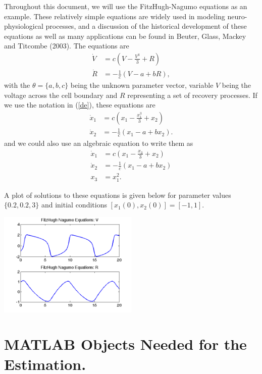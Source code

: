 \documentclass{article}
\begin{document}
Throughout this document, we will use the FitzHugh-Nagumo equations as an example. These relatively
simple equations are widely used in modeling neuro-physiological processes, and a discussion of the
historical development of these equations as well as many applications can be found in Beuter,
Glass, Mackey and Titcombe (2003). The equations are
\begin{eqnarray} \label{FhNequations}
  \dot{V} & = c \left( V - \frac{V^3}{3} + R \right) \\
  \dot{R} & = -\frac{1}{c} \left( V -a + bR \right),
\end{eqnarray}
with the $\theta = \{a,b,c\}$ being the unknown parameter vector, variable $V$ being the voltage
across the cell boundary and $R$ representing a set of recovery processes. If we use the notation
in (\ref{de}), these equations are
\begin{eqnarray} \label{FhNequations2}
  \dot{x}_1 & = c \left( x_1 - \frac{x_1^3}{3} + x_2 \right) \\
  \dot{x}_2 & = -\frac{1}{c} \left( x_1 -a + bx_2 \right).
\end{eqnarray}
and we could also use an algebraic equation to write them as
\begin{eqnarray} \label{FhNequations2}
  \dot{x}_1 & = c \left( x_1 - \frac{x_3}{3} + x_2 \right) \\
  \dot{x}_2 & = -\frac{1}{c} \left( x_1 -a + bx_2 \right) \\
  x_3       & = x_1^2.
\end{eqnarray}

A plot of solutions to these equations is given below for parameter values $\{0.2,0.2,3\}$ and
initial conditions $[x_1(0),x_2(0)] = [-1,1]$.

\begin{center}
  \includegraphics[height=5cm]{figs/fhn_paths.png}
\end{center}

\section{MATLAB Objects Needed for the Estimation. }
\end{document}
